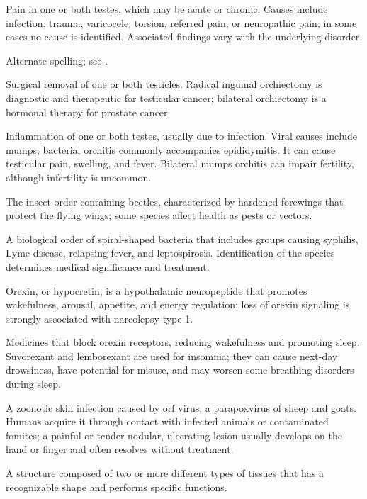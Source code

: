  Pain in one or both testes, which may be acute or chronic.
Causes include infection, trauma, varicocele, torsion, referred pain, or neuropathic
pain; in some cases no cause is identified. Associated findings vary with the
underlying disorder.

 Alternate spelling; see .

 Surgical removal of one or both testicles. Radical inguinal orchiectomy is diagnostic
and therapeutic for testicular cancer; bilateral orchiectomy is a hormonal therapy for
prostate cancer.

 Inflammation of one or both testes, usually due to infection.
Viral
causes include mumps; bacterial orchitis commonly accompanies epididymitis. It can cause
testicular pain, swelling, and fever. Bilateral mumps orchitis can impair fertility,
although infertility is uncommon.

 The insect order containing beetles, characterized by hardened forewings that protect the flying wings; some species affect health as pests or vectors.

 A biological order of spiral-shaped bacteria that includes groups causing syphilis, Lyme disease, relapsing fever, and leptospirosis. Identification of the species determines medical significance and treatment.

 Orexin, or hypocretin, is a hypothalamic neuropeptide that promotes wakefulness, arousal, appetite, and energy regulation; loss of orexin signaling is strongly associated with narcolepsy type 1.

 Medicines that block orexin receptors, reducing wakefulness and promoting sleep. Suvorexant and lemborexant are used for insomnia; they can cause next-day drowsiness, have potential for misuse, and may worsen some breathing disorders during sleep.

 A zoonotic skin infection caused by orf virus, a parapoxvirus of sheep and goats. Humans acquire it through contact with infected animals or contaminated fomites; a painful or tender nodular, ulcerating lesion usually develops on the hand or finger and often resolves without treatment.

 A structure composed of two or more different types of tissues that has a recognizable
shape and performs specific functions.


